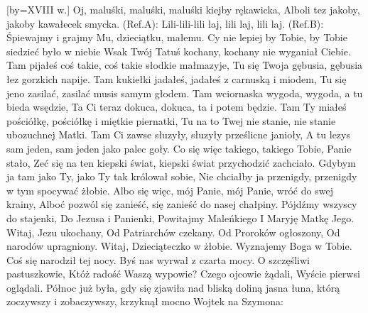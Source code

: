 [by={XVIII w.}]
\beginverse
    Oj, maluśki, maluśki, maluśki kiejby rękawicka,
    Alboli tez jakoby, jakoby kawałecek smycka.
\endverse
\beginchorus
        (Ref.A): Lili-lili-lili laj, lili laj, lili laj.
        (Ref.B): Śpiewajmy i grajmy Mu, dzieciątku, małemu.
\endchorus
\beginverse
    Cy nie lepiej by Tobie, by Tobie siedzieć było w niebie
    Wsak Twój Tatuś kochany, kochany nie wyganiał Ciebie.
\endverse
\beginverse
    Tam pijałeś coś takie, coś takie słodkie małmazyje,
    Tu się Twoja gębusia, gębusia łez gorzkich napije.
\endverse
\beginverse
    Tam kukiełki jadałeś, jadałeś z carnuską i miodem,
    Tu się jeno zasilać, zasilać musis samym głodem.
\endverse
\beginverse
    Tam wciornaska wygoda, wygoda, a tu bieda wsędzie,
    Ta Ci teraz dokuca, dokuca, ta i potem będzie.
\endverse
\beginverse
    Tam Ty miałeś pościółkę, pościółkę i miętkie piernatki,
    Tu na to Twej nie stanie, nie stanie ubozuchnej Matki.
\endverse
\beginverse
    Tam Ci zawse słuzyły, słuzyły prześlicne janioły,
    A tu lezys sam jeden, sam jeden jako palec goły.
\endverse
\beginverse
    Co się więc takiego, takiego Tobie, Panie stało,
    Zeć się na ten kiepski świat, kiepski świat przychodzić zachciało.
\endverse
\beginverse
    Gdybym ja tam jako Ty, jako Ty tak królował sobie,
    Nie chciałby ja przenigdy, przenigdy w tym spocywać żłobie.
\endverse
\beginverse
    Albo się więc, mój Panie, mój Panie, wróć do swej krainy,
    Alboć pozwól się zanieść, się zanieść do nasej chałpiny.
\endverse
\endsong
\beginverse
    Pójdźmy wszyscy do stajenki,
    Do Jezusa i Panienki,
\endverse
\beginchorus
    Powitajmy Maleńkiego
    I Maryję Matkę Jego.
\endchorus
\beginverse
    Witaj, Jezu ukochany,
    Od Patriarchów czekany.
\endverse
\beginchorus
    Od Proroków ogłoszony,
    Od narodów upragniony.
\endchorus
\beginverse
    Witaj, Dzieciąteczko w żłobie.
    Wyznajemy Boga w Tobie.
\endverse
\beginchorus
    Coś się narodził tej nocy.
    Byś nas wyrwał z czarta mocy.
\endchorus
\beginverse
    O szczęśliwi pastuszkowie,
    Któż radość Waszą wypowie?
\endverse
\beginchorus
    Czego ojcowie żądali,
    Wyście pierwsi oglądali.
\endchorus
\endsong
\beginverse
Północ już była, gdy się zjawiła
nad bliską doliną jasna łuna,
którą zoczywszy i zobaczywszy,
krzyknął mocno Wojtek na Szymona:
\endverse
\beginchorus
